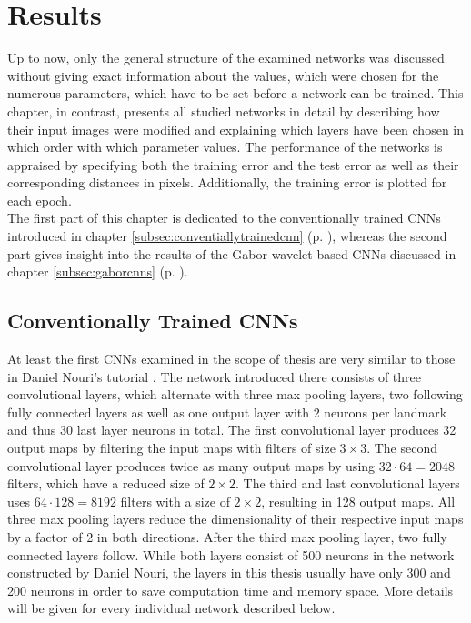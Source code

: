\documentclass[11pt, a4paper]{article}
\newcommand\myref[1]{\ref{#1} (p. \pageref{#1})}
\begin{document}
\section{Results}
\label{sec:results}

Up to now, only the general structure of the examined networks was discussed without giving exact information about the values, which were chosen for the numerous parameters, which have to be set before a network can be trained. This chapter, in contrast, presents all studied networks in detail by describing how their input images were modified and explaining which layers have been chosen in which order with which parameter values. The performance of the networks is appraised by specifying both the training error and the test error as well as their corresponding distances in pixels. Additionally, the training error is plotted for each epoch.\\
The first part of this chapter is dedicated to the conventionally trained \acp{CNN} introduced in chapter \myref{subsec:conventiallytrainedcnn}, whereas the second part gives insight into the results of the Gabor wavelet based \acp{CNN} discussed in chapter \myref{subsec:gaborcnns}.

\subsection{Conventionally Trained CNNs}

At least the first \acp{CNN} examined in the scope of thesis are very similar to those in Daniel Nouri's tutorial \cite{nouri-tutorial}. The network introduced there consists of three convolutional layers, which alternate with three max pooling layers, two following fully connected layers as well as one output layer with 2 neurons per landmark and thus 30 last layer neurons in total. The first convolutional layer produces 32 output maps by filtering the input maps with filters of size $3\times 3$. The second convolutional layer produces twice as many output maps by using $32 \cdot 64 = 2048$ filters, which have a reduced size of $2\times 2$. The third and last convolutional layers uses $64 \cdot 128 = 8192$ filters with a size of $2\times2$, resulting in 128 output maps. All three max pooling layers reduce the dimensionality of their respective input maps by a factor of 2 in both directions. After the third max pooling layer, two fully connected layers follow. While both layers consist of 500 neurons in the network constructed by Daniel Nouri, the layers in this thesis usually have only 300 and 200 neurons in order to save computation time and memory space. More details will be given for every individual network described below.
\end{document}
